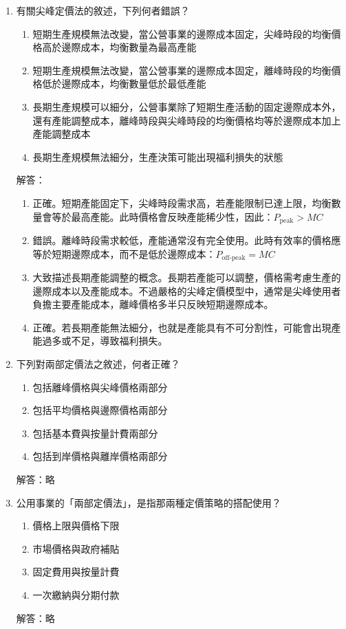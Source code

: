 \documentclass[12pt, a4paper]{article}
\begin{document}
\begin{enumerate}
    \item 有關尖峰定價法的敘述，下列何者錯誤？
    \begin{enumerate}[label=\Alph*.]
        \item 短期生產規模無法改變，當公營事業的邊際成本固定，尖峰時段的均衡價格高於邊際成本，均衡數量為最高產能
        \item 短期生產規模無法改變，當公營事業的邊際成本固定，離峰時段的均衡價格低於邊際成本，均衡數量低於最低產能
        \item 長期生產規模可以細分，公營事業除了短期生產活動的固定邊際成本外，還有產能調整成本，離峰時段與尖峰時段的均衡價格均等於邊際成本加上產能調整成本
        \item 長期生產規模無法細分，生產決策可能出現福利損失的狀態
    \end{enumerate}
    解答：
    \begin{enumerate}[label=\Alph*.]
        \item 正確。短期產能固定下，尖峰時段需求高，若產能限制已達上限，均衡數量會等於最高產能。此時價格會反映產能稀少性，因此：$P_{{\text{peak}}} > MC$
        \item 錯誤。離峰時段需求較低，產能通常沒有完全使用。此時有效率的價格應等於短期邊際成本，而不是低於邊際成本：$P_{\text{off-peak}} = MC$
        \item 大致描述長期產能調整的概念。長期若產能可以調整，價格需考慮生產的邊際成本以及產能成本。不過嚴格的尖峰定價模型中，通常是尖峰使用者負擔主要產能成本，離峰價格多半只反映短期邊際成本。
        \item 正確。若長期產能無法細分，也就是產能具有不可分割性，可能會出現產能過多或不足，導致福利損失。
    \end{enumerate}

    \item 下列對兩部定價法之敘述，何者正確？
    \begin{enumerate}[label=\Alph*.]
        \item 包括離峰價格與尖峰價格兩部分
        \item 包括平均價格與邊際價格兩部分
        \item 包括基本費與按量計費兩部分
        \item 包括到岸價格與離岸價格兩部分
    \end{enumerate}
    解答：略

    \item 公用事業的「兩部定價法」，是指那兩種定價策略的搭配使用？
    \begin{enumerate}[label=\Alph*.]
        \item 價格上限與價格下限
        \item 市場價格與政府補貼
        \item 固定費用與按量計費
        \item 一次繳納與分期付款
    \end{enumerate}
    解答：略


\end{enumerate}
\end{document}

